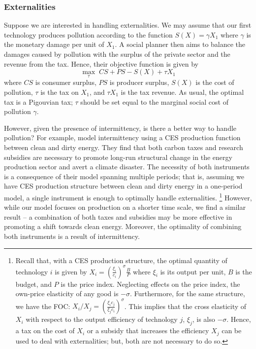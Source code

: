 \documentclass[11pt,a4paper]{extarticle}
\begin{document}
\subsubsection{Externalities}



Suppose we are interested in handling externalities. We may assume that our first technology produces pollution according to the function $S(X) = \gamma X_1$ where $\gamma$ is the monetary damage per unit of $X_1$. A social planner then aims to balance the damages caused by pollution with the surplus of the private sector and the revenue from the tax. Hence, their objective function is given by
$$\max_{\tau} \; CS + PS - S(X) + \tau X_1$$
where $CS$ is consumer surplus, $PS$ is producer surplus, $S(X)$ is the cost of pollution, $\tau$ is the tax on $X_1$, and $\tau X_1$ is the tax revenue. As usual, the optimal tax is a Pigouvian tax; $\tau$ should be set equal to the marginal social cost of pollution $\gamma$.


However, given the presence of intermittency, is there a better way to handle pollution? For example, \citet{Ace2012} model intermittency using a CES production function between clean and dirty energy. They find that both carbon taxes and research subsidies are necessary to promote long-run structural change in the energy production sector and avert a climate disaster. The necessity of both instruments is a consequence of their model spanning multiple periods; that is, assuming we have CES production structure between clean and dirty energy in a one-period model, a single instrument is enough to optimally handle externalities. \footnote{ Recall that, with a CES production structure, the optimal quantity of technology $i$ is given by $X_i = \left( \frac{\xi_i}{c_i} \right)^\sigma  \frac{B}{P}$ where $\xi_i$ is its output per unit, $B$ is the budget, and $P$ is the price index. Neglecting effects on the price index, the own-price elasticity of any good is $-\sigma$. Furthermore, for the same structure,  we have the FOC: $X_i/X_j =  \left( \frac{\xi_i c_j}{\xi_j c_i} \right)^\sigma$. This implies that the cross elasticity of $X_i$ with respect to the output efficiency of technology $j$, $\xi_j$, is also $-\sigma$. Hence, a tax on the cost of $X_i$ or a subsidy that increases the efficiency $X_j$ can be used to deal with externalities; but, both are not necessary to do so.} However, while our model focuses on production on a shorter time scale, we find a similar result -- a combination of both taxes and subsidies may be more effective in promoting a shift towards clean energy. Moreover, the optimality of combining both instruments is a result of intermittency. 
\end{document}
